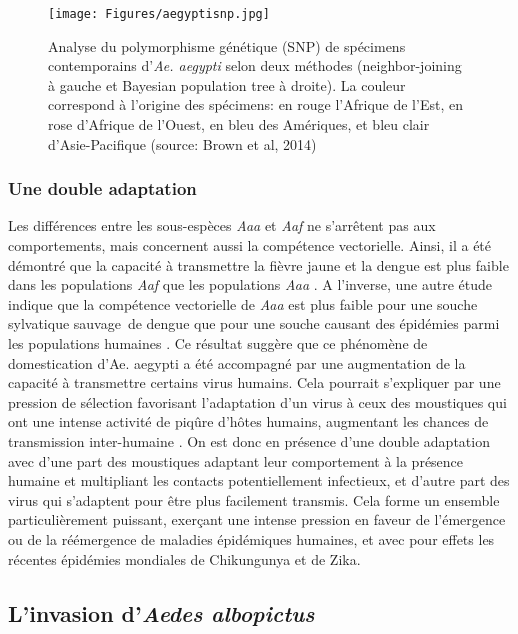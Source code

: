 \begin{figure}[t]
	\centering
	\texttt{[image: Figures/aegyptisnp.jpg]}
	\caption{Analyse du polymorphisme génétique (SNP) de spécimens contemporains d'{\em Ae. aegypti} selon deux méthodes (\guillemotleft neighbor-joining\guillemotright \;  à gauche et \guillemotleft Bayesian population tree\guillemotright \; à droite). La couleur correspond à l'origine des spécimens: en rouge l'Afrique de l'Est, en rose d'Afrique de l'Ouest, en bleu des Amériques, et bleu clair d'Asie-Pacifique (source: Brown et al, 2014)}
	\label{fig:aegyptisnp}
\end{figure}


\subsubsection{Une double adaptation}

Les différences entre les sous-espèces {\em Aaa} et {\em Aaf} ne s'arrêtent pas aux comportements, mais concernent aussi la compétence vectorielle. 
Ainsi, il a été démontré que la capacité à transmettre la fièvre jaune et la dengue est plus faible dans les populations {\em Aaf} que les populations {\em Aaa} \cite{black2002flavivirus}.
A l'inverse, une autre étude indique que la compétence vectorielle de {\em Aaa} est plus faible pour une souche sylvatique \guillemotleft sauvage\guillemotright \;\, de dengue que pour une souche causant des épidémies parmi les populations humaines \cite{moncayo2004dengue}.
Ce résultat suggère que ce phénomène de domestication d'{Ae. aegypti} a été accompagné par une augmentation de la capacité à transmettre certains virus humains.
Cela pourrait s'expliquer par une pression de sélection favorisant l'adaptation d'un virus à ceux des moustiques qui ont une intense activité de piqûre d'hôtes humains, augmentant les chances de transmission inter-humaine \cite{powell2013history}.
On est donc en présence d'une double adaptation avec d'une part des moustiques adaptant leur comportement à la présence humaine et multipliant les contacts potentiellement infectieux, et d'autre part des virus qui s'adaptent pour être plus facilement transmis. 
Cela forme un ensemble particulièrement puissant, exerçant une intense pression en faveur de l'émergence ou de la réémergence de maladies épidémiques humaines, et avec pour effets les récentes épidémies mondiales de Chikungunya et de Zika.



\subsection{L'invasion d'{\em Aedes albopictus} }


